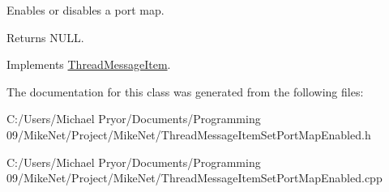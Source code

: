 Enables or disables a port map. 

\begin{DoxyReturn}{Returns}
NULL. 
\end{DoxyReturn}


Implements \hyperlink{class_thread_message_item_ae09a47834e313524b19700ebc92b0dfe}{ThreadMessageItem}.



The documentation for this class was generated from the following files:\begin{DoxyCompactItemize}
\item 
C:/Users/Michael Pryor/Documents/Programming 09/MikeNet/Project/MikeNet/ThreadMessageItemSetPortMapEnabled.h\item 
C:/Users/Michael Pryor/Documents/Programming 09/MikeNet/Project/MikeNet/ThreadMessageItemSetPortMapEnabled.cpp\end{DoxyCompactItemize}
